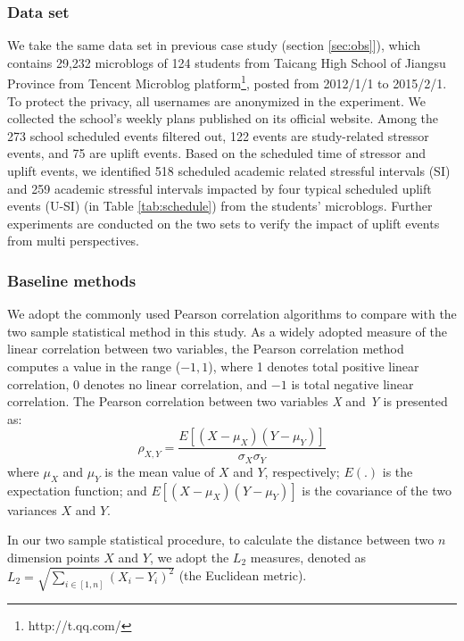 \subsubsection{Data set}
We take the same data set in previous case study (section \ref{sec:obs}]),
which contains 29,232 microblogs of 124 students from Taicang High School of Jiangsu Province from Tencent Microblog platform\footnote{http://t.qq.com/},  posted from 2012/1/1 to 2015/2/1.
To protect the privacy, all usernames are anonymized in the experiment.
We collected the school's weekly plans published on its official website. %
Among the 273 school scheduled events filtered out,
122 events are study-related stressor events, and 75 are uplift events.
Based on the scheduled time of stressor and uplift events,
we identified 518 scheduled academic related stressful intervals (SI)
and 259 academic stressful intervals impacted by four typical scheduled uplift events (U-SI) (in Table \ref{tab:schedule})
from the students' microblogs.
Further experiments are conducted on the two sets to verify the impact of uplift events from multi perspectives.

\subsubsection{Baseline methods}
We adopt the commonly used Pearson correlation algorithms to compare with the two sample statistical method in this study.
As a widely adopted measure of the linear correlation between two variables,
the Pearson correlation method computes a value in the range ($-1,1$),
where 1 denotes total positive linear correlation,
0 denotes no linear correlation,
and $-1$ is total negative linear correlation.
The Pearson correlation between two variables \emph{X} and \emph{Y} is presented as:
\begin{equation}
\rho_{X,Y} = \frac{E[(X-\mu_X)(Y-\mu_Y)]}{\sigma_X\sigma_Y}
\end{equation}
where $\mu_X$ and $\mu_Y$ is the mean value of $X$ and $Y$, respectively;
$E(.)$ is the expectation function;
and $E[(X-\mu_X)(Y-\mu_Y)]$ is the covariance of the two variances $X$ and $Y$.

In our two sample statistical procedure,
to calculate the distance between two $n$ dimension points $X$ and $Y$,
we adopt the $L_2$ measures,
denoted as $L_2 = \sqrt{\sum_{i\in[1,n]}(X_i-Y_i)^2}$ (the Euclidean metric).

